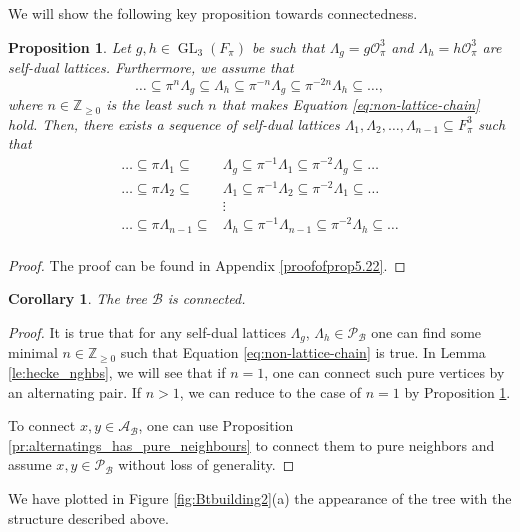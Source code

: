 \documentclass{eptcs}
\newtheorem{corollary}[theorem]{Corollary}
\newtheorem{proposition}[theorem]{Proposition}
\theoremstyle{remark}
\theoremstyle{definition}
\DeclareMathOperator{\GL}{GL}
\begin{document}
We will show the following key proposition towards connectedness. 
\begin{proposition}
\label{pr:chain}
    Let $g,h \in \GL_{3}(F_{\pi})$ be such that $\Lambda_{g} = g \mathcal{O}_{\pi}^{3}$ and $\Lambda_{h} =h \mathcal{O}_{\pi}^{3}$ are self-dual lattices. Furthermore, we assume that 
    \begin{equation}
	\dots \subseteq \pi^{n}\Lambda_{g} \subseteq \Lambda_{h} \subseteq \pi^{-n}\Lambda_{g} \subseteq  \pi^{-2n} \Lambda_{h} \subseteq \dots,
	\label{eq:non-lattice-chain}
    \end{equation}
    where $n \in \mathbb{Z}_{\geq 0}$ is the least such $n$ that makes Equation \ref{eq:non-lattice-chain} hold.
    Then, there exists a sequence of self-dual lattices $\Lambda_{1}, \Lambda_{2} ,\dots, \Lambda_{n-1} \subseteq F_{\pi}^{3}$ such that 
    \begin{align}
	\label{eq:non-lattice-chain2}
	\dots \subseteq \pi \Lambda_{1} \subseteq &  \Lambda_{g} \subseteq  \pi^{-1} \Lambda_{1} \subseteq \pi^{-2}\Lambda_{g} \subseteq \dots \\
	 \dots \subseteq \pi \Lambda_{2} \subseteq &  \Lambda_{1} \subseteq  \pi^{-1} \Lambda_{2} \subseteq \pi^{-2}\Lambda_{1} \subseteq \dots \\
						   & \vdots \\
	 \dots \subseteq \pi \Lambda_{n-1} \subseteq &  \Lambda_{h} \subseteq  \pi^{-1} \Lambda_{n-1} \subseteq \pi^{-2}\Lambda_{h} \subseteq \dots \\
    \end{align}
\end{proposition}
\begin{proof}
The proof can be found in Appendix \ref{proofofprop5.22}.
\end{proof}
\begin{corollary}
The tree $\mathcal{B}$ is connected.
\end{corollary}
\begin{proof}
    It is true that for any self-dual lattices $\Lambda_{g}$, $\Lambda_{h} \in \mathcal{P}_{\mathcal{B}}$ one can find some minimal $n \in \mathbb{Z}_{\geq 0}$ such that 
   Equation \ref{eq:non-lattice-chain} is true. In Lemma \ref{le:hecke_nghbs}, we will see that if $n=1$, one can connect such pure vertices by an alternating pair. If $n>1$, we can reduce to the case of $n=1$ by Proposition \ref{pr:chain}.

   To connect $x,y \in \mathcal{A}_{\mathcal{B}}$, one can use Proposition \ref{pr:alternatings_has_pure_neighbours} to connect them to pure neighbors and assume $x,y \in \mathcal{P}_{\mathcal{B}}$ without loss of generality.
\end{proof}
                  We have plotted in Figure \ref{fig:Btbuilding2}(a) the appearance of the tree with the structure described above.
\end{document}
